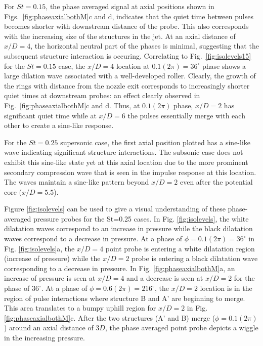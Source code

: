 \documentclass[english]{aiaa-tc}
\begin{document}
For $St=0.15$, the phase averaged signal at axial positions shown in
Figs.~\ref{fig:phaseaxialbothM}c and d, indicates that the quiet time between
pulses becomes shorter with downstream distance of the probe.  This
also corresponds with the increasing size of the structures in the jet. At an
axial distance of $x/D=4$, the horizontal neutral part of the phases
is minimal, suggesting that the subsequent structure interaction is occuring.  Correlating to
Fig.~\ref{fig:isolevels15} for the $St=0.15$ case, the $x/D=4$ location at
$0.1(2\pi)=36^\circ$ phase shows a large dilation wave associated with
a well-developed roller. Clearly, the growth of the rings with
distance from the nozzle exit corresponds to increasingly shorter
quiet times at downstream probes: an effect clearly observed in
Fig.~\ref{fig:phaseaxialbothM}c and d.  Thus, at $0.1(2\pi)$ phase, $x/D=2$ has
significant quiet time while at $x/D=6$ the pulses essentially merge
with each other to create a sine-like response.

For the $St=0.25$ supersonic case, the first axial position plotted has a sine-like wave indicating significant structure interactions. The subsonic case does not exhibit this sine-like state yet at this axial location due to the more prominent secondary compression wave that is seen in the impulse response at this location. The waves maintain a sine-like pattern beyond $x/D=2$ even after the potential core ($x/D=5.5$).

Figure \ref{fig:isolevels} can be used to give a visual understanding of these phase-averaged pressure probes for the St=0.25 cases. In Fig. \ref{fig:isolevels}, the white dilatation waves correspond to an increase in pressure while the black dilatation waves correspond to a decrease in pressure. At a phase of $\phi=0.1(2\pi)=36^\circ$ in Fig. \ref{fig:isolevels}a, the $x/D=4$ point probe is entering a white dilatation region (increase of pressure) while the $x/D=2$ probe is entering a black dilatation wave corresponding to a decrease in pressure. In Fig. \ref{fig:phaseaxialbothM}a, an increase of pressure is seen at $x/D=4$ and a decrease is seen at $x/D=2$ for the phase of $36^\circ$. At a phase of $\phi=0.6(2\pi)=216^\circ$, the $x/D=2$ location is in the region of pulse interactions where structure B and A' are beginning to merge. This area translates to a bumpy uphill region for $x/D=2$ in Fig. \ref{fig:phaseaxialbothM}c. After the two structures (A' and B) merge ($\phi=0.1(2\pi)$) around an axial distance of $3D$, the phase averaged point probe depicts a wiggle in the increasing pressure.
\end{document}
